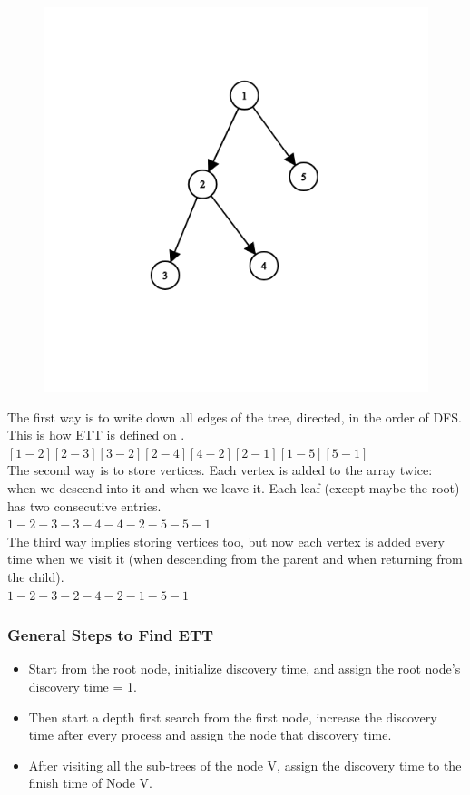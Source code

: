 \documentclass[12pt]{article}
\begin{document}
\begin{figure}[H]
  \centering
  \includegraphics[width=\linewidth/4]{graph3.png}
\end{figure}

The first way is to write down all edges of the tree, directed, in the order of DFS. This is how ETT is defined on \cite{4} . \\ 
$[1-2] [2-3] [3-2] [2-4] [4-2] [2-1] [1-5] [5-1]$\\

The second way is to store vertices. Each vertex is added to the array twice: when we descend into it and when we leave it. Each leaf (except maybe the root) has two consecutive entries.\\
$1 - 2 - 3 - 3 - 4 - 4 - 2 - 5 - 5 - 1$\\
The third way implies storing vertices too, but now each vertex is added every time when we visit it (when descending from the parent and when returning from the child).\\
$1 - 2 - 3 - 2 - 4 - 2 - 1 - 5 - 1$\\

\subsubsection{General Steps to Find ETT}
\begin{itemize}
    \item Start from the root node, initialize discovery time, and assign the root node's discovery time = 1.
    \item Then start a depth first search from the first node, increase the discovery time after every process and assign the node that discovery time.
    \item After visiting all the sub-trees of the node V, assign the discovery time to the finish time of Node V.
\end{itemize}
\end{document}
